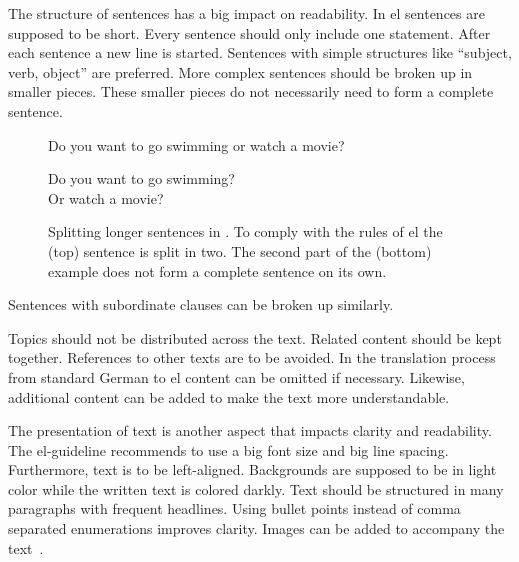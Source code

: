 The structure of sentences has a big impact on readability. %
In \gls{el} sentences are supposed to be short.
Every sentence should only include one statement.
After each sentence a new line is started.
Sentences with simple structures like \enquote{subject, verb, object} are preferred.
More complex sentences should be broken up in smaller pieces.
These smaller pieces do not necessarily need to form a complete sentence.
\begin{figure}[htb]
    \begin{center}
        \colorbox{badred!20}{
            \begin{minipage}{0.6\textwidth}
                Do you want to go swimming or watch a movie?
            \end{minipage}
        }
        \colorbox{goodgreen!20}{
            \begin{minipage}{0.6\textwidth}
                Do you want to go swimming? \\
                Or watch a movie?
            \end{minipage}
        }
    \end{center}
    \caption[Splitting longer sentences in .]{Splitting longer sentences in . To comply with the rules of \gls{el} the (top) sentence is split in two. The second part of the (bottom) example does not form a complete sentence on its own.}
    \label{fig:split_sentence}
\end{figure}
Sentences with subordinate clauses can be broken up similarly.

Topics should not be distributed across the text.
Related content should be kept together.
References to other texts are to be avoided.
In the translation process from standard German to \gls{el} content can be omitted if necessary.
Likewise, additional content can be added to make the text more understandable.

The presentation of text is another aspect that impacts clarity and readability.
The \gls{el}-guideline recommends to use a big font size and big line spacing.
Furthermore, text is to be left-aligned.
Backgrounds are supposed to be in light color while the written text is colored darkly.
Text should be structured in many paragraphs with frequent headlines.
Using bullet points instead of comma separated enumerations improves clarity.
Images can be added to accompany the text~\autocite{netzwerkLS}.


